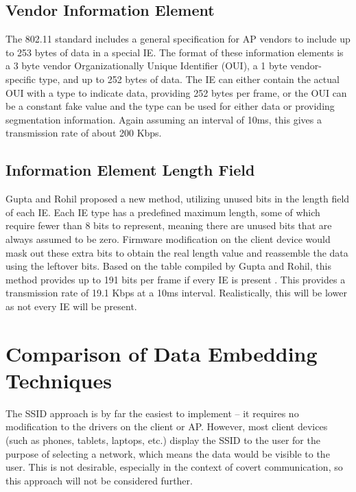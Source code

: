 \documentclass[letterpaper, 10 pt, conference]{ieeeconf}  %
\begin{document}
\subsection{Vendor Information Element}

The 802.11 standard includes a general specification for AP vendors to include up to 253 bytes of data in a special IE.  The format of these information elements is a 3 byte vendor Organizationally Unique Identifier (OUI), a 1 byte vendor-specific type, and up to 252 bytes of data. The IE can either contain the actual OUI with a type to indicate data, providing 252 bytes per frame, or the OUI can be a constant fake value and the type can be used for either data or providing segmentation information.  Again assuming an interval of 10ms, this gives a transmission rate of about 200 Kbps.

\subsection{Information Element Length Field}

Gupta and Rohil proposed a new method, utilizing unused bits in the length field of each IE. Each IE type has a predefined maximum length, some of which require fewer than 8 bits to represent, meaning there are unused bits that are always assumed to be zero.  Firmware modification on the client device would mask out these extra bits to obtain the real length value and reassemble the data using the leftover bits. Based on the table compiled by Gupta and Rohil, this method provides up to 191 bits per frame if every IE is present \cite{c2}. This provides a transmission rate of 19.1 Kbps at a 10ms interval.  Realistically, this will be lower as not every IE will be present.


\section{Comparison of Data Embedding Techniques}

The SSID approach is by far the easiest to implement -- it requires no modification to the drivers on the client or AP. However, most client devices (such as phones, tablets, laptops, etc.) display the SSID to the user for the purpose of selecting a network, which means the data would be visible to the user.  This is not desirable, especially in the context of covert communication, so this approach will not be considered further.
\end{document}

